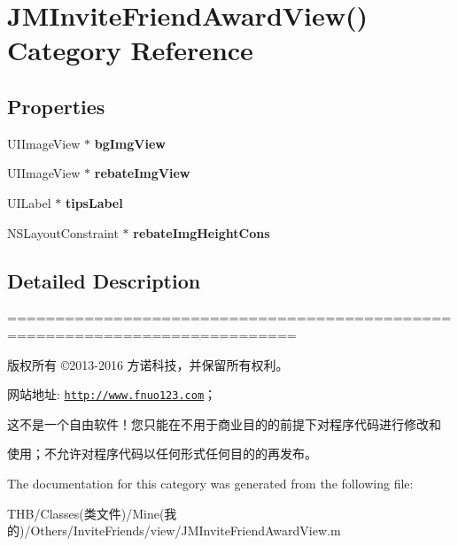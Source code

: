 \hypertarget{category_j_m_invite_friend_award_view_07_08}{}\section{J\+M\+Invite\+Friend\+Award\+View() Category Reference}
\label{category_j_m_invite_friend_award_view_07_08}
\subsection*{Properties}
\begin{DoxyCompactItemize}
\item 
\mbox{\label{category_j_m_invite_friend_award_view_07_08_a0e2480728bfc5302c720bb1806e2fe76}} 
U\+I\+Image\+View $\ast$ {\bfseries bg\+Img\+View}
\item 
\mbox{\label{category_j_m_invite_friend_award_view_07_08_a5262bb4591b0692b4b54ad35878d0cbd}} 
U\+I\+Image\+View $\ast$ {\bfseries rebate\+Img\+View}
\item 
\mbox{\label{category_j_m_invite_friend_award_view_07_08_a88916fa27c9afe979733c7f857a62d5e}} 
U\+I\+Label $\ast$ {\bfseries tips\+Label}
\item 
\mbox{\label{category_j_m_invite_friend_award_view_07_08_aa12d3add1c420334aa7700a308b5e22d}} 
N\+S\+Layout\+Constraint $\ast$ {\bfseries rebate\+Img\+Height\+Cons}
\end{DoxyCompactItemize}


\subsection{Detailed Description}
============================================================================

版权所有 ©2013-\/2016 方诺科技，并保留所有权利。

网站地址\+: \href{http://www.fnuo123.com}{\tt http\+://www.\+fnuo123.\+com}； 



这不是一个自由软件！您只能在不用于商业目的的前提下对程序代码进行修改和

使用；不允许对程序代码以任何形式任何目的的再发布。 

 

The documentation for this category was generated from the following file\+:\begin{DoxyCompactItemize}
\item 
T\+H\+B/\+Classes(类文件)/\+Mine(我的)/\+Others/\+Invite\+Friends/view/J\+M\+Invite\+Friend\+Award\+View.\+m\end{DoxyCompactItemize}
